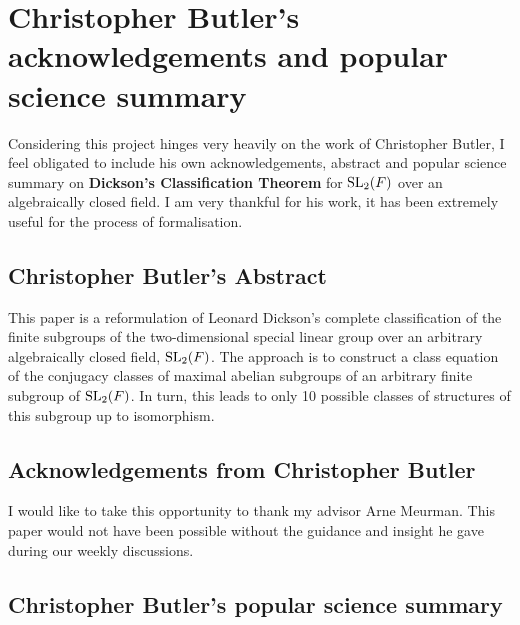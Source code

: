 \section{Christopher Butler's acknowledgements and popular science summary}

Considering this project hinges very heavily on the work of Christopher Butler, I feel obligated to include his own acknowledgements,
 abstract and popular science summary on \textbf{Dickson's Classification Theorem} for $\operatorname{SL}_2(F)$ over an algebraically closed field.
I am very thankful for his work, it has been extremely useful for the process of formalisation.

\subsection{Christopher Butler's Abstract }

This paper is a reformulation of Leonard Dickson's complete classification of the finite subgroups of the two-dimensional special linear group over an arbitrary algebraically closed field, $\operatorname{SL}_2(F)$. The approach is to construct a class equation of the conjugacy classes of maximal abelian subgroups of an arbitrary finite subgroup of $\operatorname{SL}_2(F)$. In turn, this leads to only 10 possible classes of structures of this subgroup up to isomorphism.

\subsection{Acknowledgements from Christopher Butler}

I would like to take this opportunity to thank my advisor Arne Meurman. This paper would not have been possible without the guidance and insight he gave during our weekly discussions.


\subsection{Christopher Butler's popular science summary}

